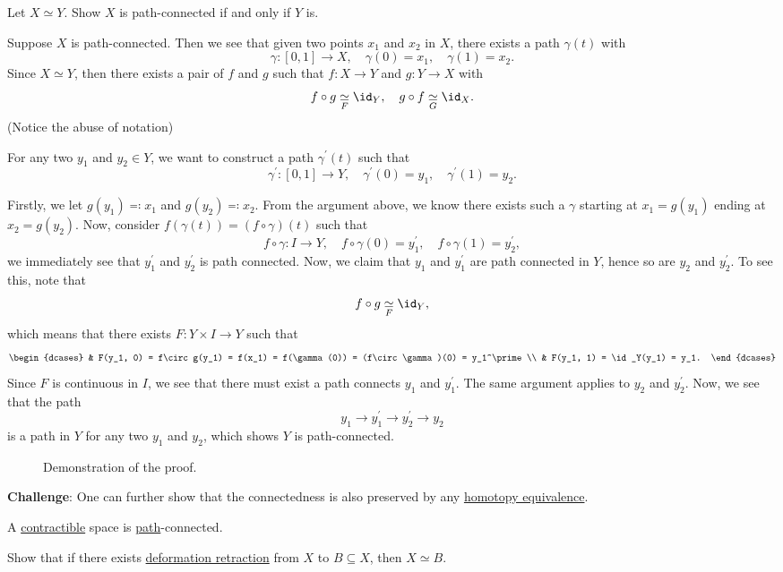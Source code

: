 \begin{exercise}
	Let \(X\simeq Y\). Show \(X\) is path-connected if and only if \(Y\) is.
\end{exercise}
\begin{answer}
	Suppose \(X\) is path-connected. Then we see that given two points \(x_1\) and \(x_2\) in \(X\), there exists a path \(\gamma(t)\) with
	\[
		\gamma\colon [0, 1]\to X,\quad \gamma(0) = x_1,\quad \gamma(1) = x_2.
	\]
	Since \(X\simeq Y\), then there exists a pair of \(f\) and \(g\) such that \(f\colon X\to Y\) and \(g\colon Y\to X\) with
	\[
		f\circ g\underset{F}{\simeq} \id_Y,\quad g\circ f\underset{G}{\simeq} \id_X.
	\]
	(Notice the abuse of notation)

	For any two \(y_1\) and \(y_2\in Y\), we want to construct a path \(\gamma^\prime (t)\) such that
	\[
		\gamma^\prime \colon [0, 1]\to Y,\quad \gamma^\prime (0) = y_1,\quad \gamma^\prime (1) = y_2.
	\]

	Firstly, we let \(g(y_1) \eqqcolon x_1\) and \(g(y_2) \eqqcolon x_2\). From the argument above, we know there exists such
	a \(\gamma\) starting at \(x_1 = g(y_1)\) ending at \(x_2 = g(y_2)\). Now, consider \(f(\gamma(t)) = (f\circ \gamma) (t)\)
	such that
	\[
		f\circ \gamma\colon I\to Y,\quad f\circ \gamma(0) = y_1^\prime,\quad f\circ \gamma(1) = y_2^\prime,
	\]
	we immediately see that \(y_{1}^\prime\) and \(y_2^\prime \) is path connected. Now, we
	claim that \(y_1\) and \(y_1^\prime\) are path connected in \(Y\), hence so are \(y_2\) and \(y_2^\prime \).
	To see this, note that
	\[
		f\circ g\underset{F}{\simeq} \id_Y,
	\]
	which means that there exists \(F\colon Y\times I\to Y\) such that
	\[
		\begin{dcases}
			 & F(y_1, 0) = f\circ g(y_1) = f(x_1) = f(\gamma(0)) = (f\circ \gamma)(0) = y_1^\prime \\
			 & F(y_1, 1) = \id_Y(y_1) = y_1.
		\end{dcases}
	\]
	Since \(F\) is continuous in \(I\), we see that there must exist a path connects \(y_1\) and \(y_1^\prime \). The same argument applies to
	\(y_2\) and \(y_2^\prime \). Now, we see that the path
	\[
		y_1 \to y_1^\prime \to y_2^\prime \to y_2
	\]
	is a path in \(Y\) for any two \(y_1\) and \(y_2\), which shows \(Y\) is path-connected.

	\begin{figure}[H]
		\centering
		\caption{Demonstration of the proof.}
		\label{fig:eg:path-connected}
	\end{figure}
\end{answer}

\textbf{Challenge}: One can further show that the connectedness is also preserved by any \hyperref[def:homotopy-equivalence]{homotopy equivalence}.
\begin{corollary}
	A \hyperref[def:contractible]{contractible} space is \hyperref[def:path]{path}-connected.
\end{corollary}

\begin{exercise}
	Show that if there exists \hyperref[def:deformation-retraction]{deformation retraction} from \(X\) to \(B\subseteq X\), then \(X\simeq B\).
\end{exercise}
